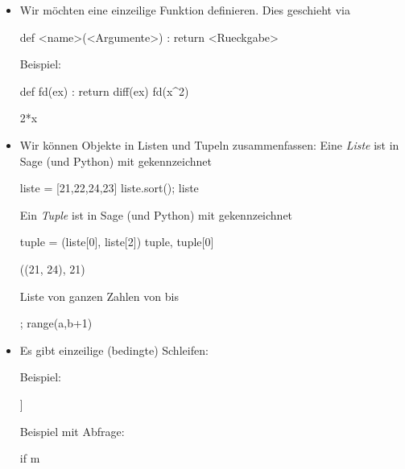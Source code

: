\documentclass[fontsize=12pt,paper=a4,twoside,bibtotoc,idxtotoc,
liststotoc,pagesize,BCOR1.2cm,DIV15,chapterprefix,pagesize=pdftex]{scrbook}
\begin{document}
\begin{itemize}
 \item Wir möchten eine einzeilige Funktion definieren. Dies geschieht via
  \begin{sagein}
  def <name>(<Argumente>) : return <Rueckgabe>
  \end{sagein}
  Beispiel: 
  \begin{sagein}
  def fd(ex) : return diff(ex)
  fd(x^2)
  \end{sagein}
  \begin{sage}
  2*x
  \end{sage}
 \item Wir können Objekte in Listen und Tupeln zusammenfassen:\newline
  Eine \emph{Liste} ist in Sage (und Python) mit \isage{[..,..]} gekennzeichnet
  \begin{sagein}
  liste = [21,22,24,23]
  liste.sort(); liste 
  \end{sagein}
  \begin{sage}
  [21, 22, 23, 24]
  \end{sage}
  Ein \emph{Tuple} ist in Sage (und Python) mit  gekennzeichnet 
  \begin{sagein}
  tuple = (liste[0], liste[2])
  tuple, tuple[0]
  \end{sagein}
  \begin{sage}
  ((21, 24), 21) 
  \end{sage}
  Liste von ganzen Zahlen von  bis 
  \begin{sagein}
  [a..b] ; range(a,b+1)
  \end{sagein}
 \item Es gibt einzeilige (bedingte) Schleifen:
  \begin{sagein}
  \end{sagein}
  Beispiel:
  \begin{sagein}
  [m^2 for m in [1..5] ]
  \end{sagein}
  \begin{sage}
  [1, 4, 9, 16, 25]
  \end{sage}
  Beispiel mit Abfrage:
  \begin{sagein}
  [m^2 for m in [1..5] if m%
  \end{sagein}
  \begin{sage}
  [4, 16]
  \end{sage}
\end{itemize}
\end{document}
